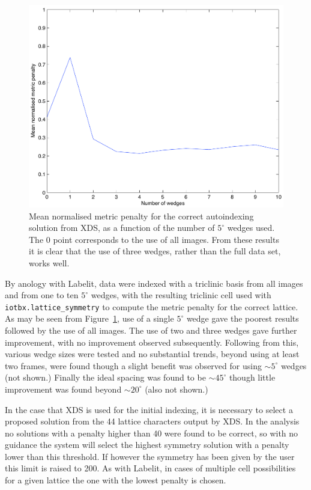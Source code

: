 \documentclass[preprint,pdf]{iucr}
\begin{document}
\begin{figure}
\caption{Mean normalised metric penalty for the correct autoindexing 
solution from XDS, as a function of the number of $5^{\circ}$ wedges used.
The 0 point corresponds to the use of all images. From these results it is
clear that the use of three wedges, rather than the full data set, works
well.
\label{figure:xds_n_images}}
\centering
\includegraphics[scale=0.5]{figures/xds_n_wedges.pdf}
\end{figure}

By anology with Labelit, data were indexed with a triclinic basis
from all images and from one to ten $5^{\circ}$ wedges, with the
resulting triclinic cell used with \verb|iotbx.lattice_symmetry| to
compute the metric penalty for the correct lattice. As may be seen
from Figure~\ref{figure:xds_n_images},
use of a single $5^{\circ}$ wedge gave the poorest
results followed by the use of all images. The use of two and three
wedges gave further improvement, with no improvement observed
subsequently. Following from this, various wedge sizes were tested and
no substantial trends, beyond using at least two frames, were found
though a slight benefit was observed for using $\sim 5^{\circ}$ wedges
(not shown.) Finally the ideal spacing was found to be $\sim
45^{\circ}$ though little improvement was found beyond $\sim
20^{\circ}$ (also not shown.)  

In the case that XDS is used for the initial indexing, it is necessary
to select a proposed solution from the 44 lattice characters output by
XDS. In the analysis no solutions with a penalty higher than 40 were
found to be correct, so with no guidance the system will select the
highest symmetry solution with a penalty lower than this threshold. If
however the symmetry has been given by the user this limit is raised
to 200. As with Labelit, in cases of multiple cell possibilities for a
given lattice the one with the lowest penalty is chosen.
\end{document}
